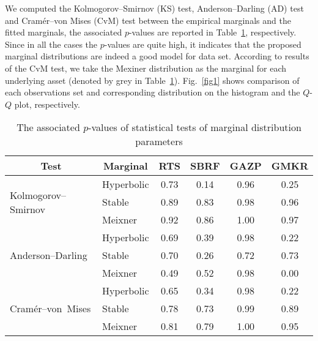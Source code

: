 \documentclass{llncs}
\begin{document}

We computed the Kolmogorov–Smirnov (KS) test, Anderson–Darling (AD) test and Cramér–von Mises (CvM) test between the
empirical marginals and the fitted marginals,  the associated $p$-values are reported in Table~\ref{dist-test}, respectively. 
Since in all the cases the $p$-values are quite high, it indicates that the proposed marginal distributions are indeed a good model for data set. According to results of the CvM test, we take the Mexiner distribution as the marginal for each underlying asset (denoted by grey in Table~\ref{dist-test}). Fig.~\ref{fig1} shows comparison of each observations set and corresponding distribution on the histogram and the $Q$-$Q$ plot, respectively.

\begin{table}[t]
\centering 
\caption{The associated $p$-values of statistical tests of marginal distribution parameters}
\label{dist-test}
\setlength{\tabcolsep}{4pt}
\begin{tabular}{llcccc} \hline 
\multicolumn{1}{c}{Test} & \multicolumn{1}{c}{Marginal} & RTS & SBRF & GAZP & GMKR \bigstrut \\ \hline 
\multirow{3}{2.3cm}{Kolmogorov--Smirnov}& Hyperbolic    & 0.73 & 0.14 & 0.96 & 0.25 \bigstrut[t] \\
                                        & Stable        & 0.89 & 0.83 & 0.98 & 0.96 \\
                                        & Meixner       & 0.92 & 0.86 & 1.00 & 0.97 \bigstrut[b] \\ \hline
\multirow{3}{2cm}{Anderson--Darling}    & Hyperbolic    & 0.69 & 0.39 & 0.98 & 0.22 \bigstrut[t] \\
                                        & Stable        & 0.70 & 0.26 & 0.72 & 0.73 \\
                                        & Meixner       & 0.49 & 0.52 & 0.98 & 0.00 \bigstrut[b] \\ \hline
\multirow{3}{1.8cm}{Cramér--von~Mises}  & Hyperbolic    & 0.65 & 0.34 & 0.98 & 0.22 \bigstrut[t] \\
                                        & Stable        & 0.78 & 0.73 & 0.99 & 0.89 \\
                                        & Meixner       & \cellcolor{Gray}0.81 & \cellcolor{Gray}0.79 & \cellcolor{Gray}1.00 & \cellcolor{Gray}0.95 \bigstrut[b] \\ \hline 
\end{tabular}
\end{table}
\end{document}
